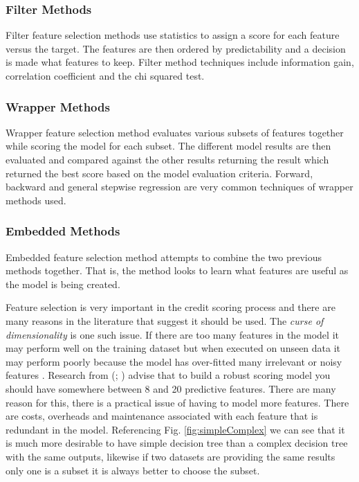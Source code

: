 \subsubsection{Filter Methods}
Filter feature selection methods use statistics to assign a score for each feature versus the target. The features are then ordered by predictability and a decision is made what features to keep. Filter method techniques include information gain, correlation coefficient and the chi squared test.

\subsubsection{Wrapper Methods}
Wrapper feature selection method evaluates various subsets of features together while scoring the model for each subset. The different model results are then evaluated and compared against the other results returning the result which returned the best score based on the model evaluation criteria. Forward, backward and general stepwise regression are very common techniques of wrapper methods used.

\subsubsection{Embedded Methods}
Embedded feature selection method attempts to combine the two previous methods together. That is, the method looks to learn what features are useful as the model is being created. 

Feature selection is very important in the credit scoring process and there are many reasons in the literature that suggest it should be used. The \textit{curse of dimensionality} is one such issue. If there are too many features in the model it may perform well on the training dataset but when executed on unseen data it may perform poorly because the model has over-fitted many irrelevant or noisy features \citep{loughrey_overfitting_2005}. Research from (\cite{thomas_consumer_2009}; \cite{mays_credit_2004})  advise that to build a robust scoring model you should have somewhere between 8 and 20 predictive features. There are many reason for this, there is a practical issue of having to model more features. There are costs, overheads and maintenance associated with each feature that is redundant in the model. Referencing Fig. \ref{fig:simpleComplex} we can see that it is much more desirable to have simple decision tree than a complex decision tree with the same outputs, likewise if two datasets are providing the same results only one is a subset it is always better to choose the subset. 

